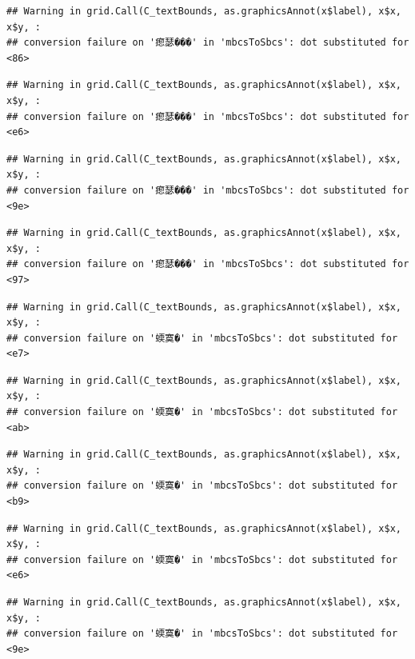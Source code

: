 \documentclass[
]{article}
\begin{document}
\begin{verbatim}
## Warning in grid.Call(C_textBounds, as.graphicsAnnot(x$label), x$x, x$y, :
## conversion failure on '瘛瑟���' in 'mbcsToSbcs': dot substituted for <86>
\end{verbatim}

\begin{verbatim}
## Warning in grid.Call(C_textBounds, as.graphicsAnnot(x$label), x$x, x$y, :
## conversion failure on '瘛瑟���' in 'mbcsToSbcs': dot substituted for <e6>
\end{verbatim}

\begin{verbatim}
## Warning in grid.Call(C_textBounds, as.graphicsAnnot(x$label), x$x, x$y, :
## conversion failure on '瘛瑟���' in 'mbcsToSbcs': dot substituted for <9e>
\end{verbatim}

\begin{verbatim}
## Warning in grid.Call(C_textBounds, as.graphicsAnnot(x$label), x$x, x$y, :
## conversion failure on '瘛瑟���' in 'mbcsToSbcs': dot substituted for <97>
\end{verbatim}

\begin{verbatim}
## Warning in grid.Call(C_textBounds, as.graphicsAnnot(x$label), x$x, x$y, :
## conversion failure on '蝡寞�' in 'mbcsToSbcs': dot substituted for <e7>
\end{verbatim}

\begin{verbatim}
## Warning in grid.Call(C_textBounds, as.graphicsAnnot(x$label), x$x, x$y, :
## conversion failure on '蝡寞�' in 'mbcsToSbcs': dot substituted for <ab>
\end{verbatim}

\begin{verbatim}
## Warning in grid.Call(C_textBounds, as.graphicsAnnot(x$label), x$x, x$y, :
## conversion failure on '蝡寞�' in 'mbcsToSbcs': dot substituted for <b9>
\end{verbatim}

\begin{verbatim}
## Warning in grid.Call(C_textBounds, as.graphicsAnnot(x$label), x$x, x$y, :
## conversion failure on '蝡寞�' in 'mbcsToSbcs': dot substituted for <e6>
\end{verbatim}

\begin{verbatim}
## Warning in grid.Call(C_textBounds, as.graphicsAnnot(x$label), x$x, x$y, :
## conversion failure on '蝡寞�' in 'mbcsToSbcs': dot substituted for <9e>
\end{verbatim}
\end{document}
